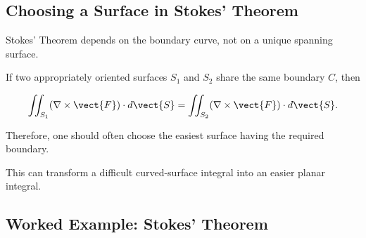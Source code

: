 \begin{center}
\end{center}

\subsection{Choosing a Surface in Stokes' Theorem}
\label{subsec:choosing-stokes-surface}

Stokes' Theorem depends on the boundary curve, not on a unique spanning
surface.

If two appropriately oriented surfaces \(S_1\) and \(S_2\) share the same
boundary \(C\), then

\[ \iint_{S_1}(\nabla\times\vect{F})\cdot d\vect{S}
=
\iint_{S_2}(\nabla\times\vect{F})\cdot d\vect{S}. \]

Therefore, one should often choose the easiest surface having the required
boundary.

This can transform a difficult curved-surface integral into an easier planar
integral.

\subsection{Worked Example: Stokes' Theorem}
\label{subsec:worked-stokes-theorem}

